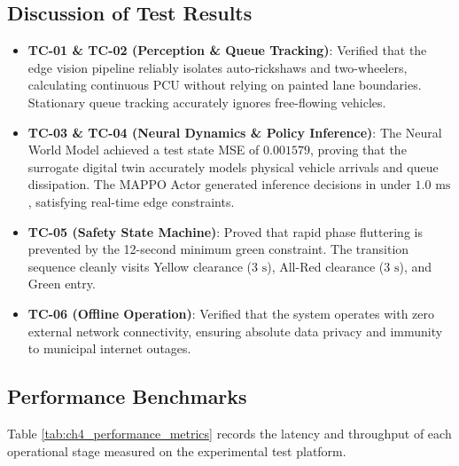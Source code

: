 \subsection{Discussion of Test Results}
\begin{itemize}
    \item \textbf{TC-01 \& TC-02 (Perception \& Queue Tracking)}: Verified that the edge vision pipeline reliably isolates auto-rickshaws and two-wheelers, calculating continuous PCU without relying on painted lane boundaries. Stationary queue tracking accurately ignores free-flowing vehicles.
    \item \textbf{TC-03 \& TC-04 (Neural Dynamics \& Policy Inference)}: The Neural World Model achieved a test state MSE of $0.001579$, proving that the surrogate digital twin accurately models physical vehicle arrivals and queue dissipation. The MAPPO Actor generated inference decisions in under $1.0\text{ ms}$, satisfying real-time edge constraints.
    \item \textbf{TC-05 (Safety State Machine)}: Proved that rapid phase fluttering is prevented by the 12-second minimum green constraint. The transition sequence cleanly visits Yellow clearance ($3\text{ s}$), All-Red clearance ($3\text{ s}$), and Green entry.
    \item \textbf{TC-06 (Offline Operation)}: Verified that the system operates with zero external network connectivity, ensuring absolute data privacy and immunity to municipal internet outages.
\end{itemize}

\subsection{Performance Benchmarks}
Table \ref{tab:ch4_performance_metrics} records the latency and throughput of each operational stage measured on the experimental test platform.

